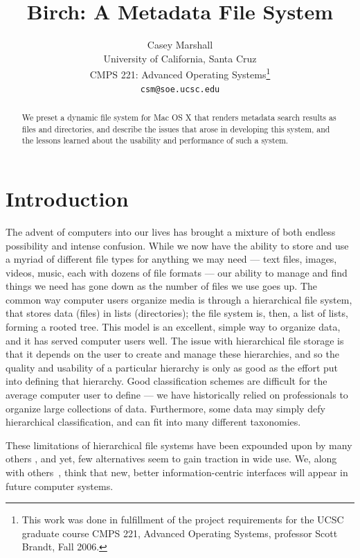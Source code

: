 \documentclass{article}
\begin{document}
\title{Birch: A Metadata File System}
\author{Casey Marshall \\
  University of California, Santa Cruz \\
  CMPS 221: Advanced Operating Systems\footnote{This work was done in
    fulfillment of the project requirements for the UCSC graduate
    course CMPS 221, Advanced Operating Systems, professor Scott
    Brandt, Fall 2006.} \\
  \texttt{csm@soe.ucsc.edu}}
\maketitle

\begin{abstract}
  We preset a dynamic file system for Mac OS X that renders metadata
  search results as files and directories, and describe the issues
  that arose in developing this system, and the lessons learned about
  the usability and performance of such a system.
\end{abstract}

\section{Introduction}
The advent of computers into our lives has brought a mixture of both
endless possibility and intense confusion. While we now have the
ability to store and use a myriad of different file types for anything
we may need --- text files, images, videos, music, each with dozens of
file formats --- our ability to manage and find things we need has
gone down as the number of files we use goes up. The common way
computer users organize media is through a hierarchical file system,
that stores data (files) in lists (directories); the file system is,
then, a list of lists, forming a rooted tree. This model is an
excellent, simple way to organize data, and it has served computer
users well. The issue with hierarchical file storage is that it
depends on the user to create and manage these hierarchies, and so the
quality and usability of a particular hierarchy is only as good as the
effort put into defining that hierarchy. Good classification schemes
are difficult for the average computer user to define --- we have
historically relied on professionals to organize large collections of
data. Furthermore, some data may simply defy hierarchical
classification, and can fit into many different taxonomies.

These limitations of hierarchical file systems have been expounded
upon by many others \cite{OToole:1992, Nielsen:1996, Gorter:2004,
  Nickell:2006}, and yet, few alternatives seem to gain traction in
wide use.  We, along with others~\cite{Veda:2005}, think that new,
better information-centric interfaces will appear in future computer
systems.
\end{document}
